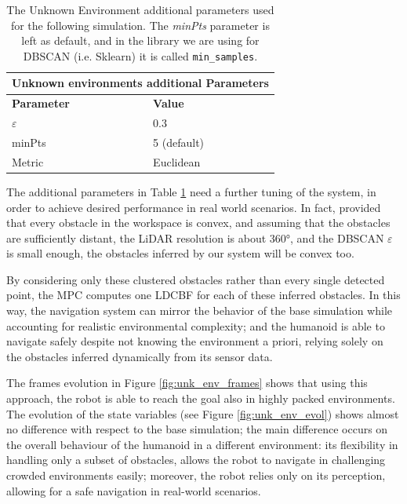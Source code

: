\begin{table}[h]
        \begin{tabular}{ |p{4cm}||p{4cm}| }
             \hline
             \multicolumn{2}{|c|}{Unknown environments additional Parameters} \\
             \hline
             \textbf{Parameter} & \textbf{Value}\\
             \hline
             $\varepsilon$ & 0.3 \\
             minPts & 5 (default) \\
             Metric & Euclidean \\
             \hline
        \end{tabular}
    \centering
    \caption{The Unknown Environment additional parameters used for the following simulation. The \textit{minPts}
        parameter is left as default, and in the library we are using for DBSCAN (i.e. Sklearn) it is called
    \texttt{min\_samples}.}
    \label{tab:dbscan-params}
\end{table}

The additional parameters in Table \ref{tab:dbscan-params} need a further tuning of the system, in order to achieve
desired performance in real world scenarios. In fact, provided that every obstacle in the workspace is convex, and
assuming that the obstacles are sufficiently distant, the LiDAR resolution is about 360°, and the
DBSCAN $\varepsilon$ is small enough, the obstacles inferred by our system will
be convex too.

By considering only these clustered obstacles rather than every single detected point, the MPC
computes one LDCBF for each of these inferred obstacles. In this way, the navigation system can mirror
the behavior of the base simulation while accounting for realistic environmental complexity; and the humanoid is
able to navigate safely despite not knowing the environment a priori, relying solely on the obstacles inferred dynamically from its sensor data.

The frames evolution in Figure \ref{fig:unk_env_frames} shows that using this approach, the robot is able to reach
the goal also in highly packed environments.
The evolution of the state variables (see
Figure \ref{fig:unk_env_evol}) shows almost no difference with respect to the base simulation; the main difference occurs on the overall behaviour
of the humanoid in a different environment: its flexibility in handling only a subset of obstacles, allows the robot to
navigate in challenging crowded environments easily; moreover, the robot relies only on its perception, allowing
for a safe navigation in real-world scenarios.


